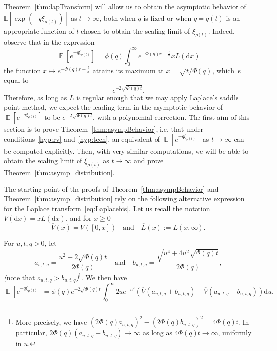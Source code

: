 \documentclass[AHL,Unicode,longabstracts,published]{cedram}
\newcommand{\bbE}{\mathbb{E}}
\DeclareMathOperator{\E}{\mathbb{E}}
\newcommand{\dd}{\mathrm{d}}
\renewcommand{\bar}[1]{\overline{#1}}
\begin{document}
Theorem~\ref{thm:lapTransform} will allow us to obtain the asymptotic behavior of $\bbE[\exp(-q\xi_{\rho(t)})]$ as $t\rightarrow \infty$, both when $q$ is fixed or when $q=q(t)$ is an appropriate function of $t$ chosen to obtain the scaling limit of $\xi_{\rho(t)}$. Indeed, observe that in the expression
\begin{equation}\label{eq:Laplacebis}
\E\left[e^{-q \xi_{\rho(t)}}\right] = \phi(q)\int_0^\infty e^{-\Phi(q)x-\frac{t}{x}} xL(\dd x)
\end{equation}
the function $x \mapsto e^{-\Phi(q)x-\frac{t}{x}}$ attains its maximum at $x=\sqrt{t/\Phi(q)}$, which is equal to
\[
e^{-2 \sqrt{\Phi(q)t}}.
\]
Therefore, as long as $L$ is regular enough that we may apply Laplace's saddle point method, we expect the leading term in the asymptotic behavior of $\E[e^{-q \xi_{\rho(t)}}]$ to be $e^{-2 \sqrt{\Phi(q)t}}$, with a polynomial correction. The first aim of this section is to prove Theorem~\ref{thm:asympBehavior}, i.e. that under conditions~\eqref{hyp:rv} and~\eqref{hyp:tech}, an equivalent of $\E[e^{-q \xi_{\rho(t)}}]$ as $t \to \infty$ can be computed explicitly. Then, with very similar computations, we will be able to obtain the scaling limit of $\xi_{\rho(t)}$ as $t \to \infty$ and prove Theorem~\ref{thm:asymp_distribution}.

The starting point of the proofs of Theorem~\ref{thm:asympBehavior} and Theorem~\ref{thm:asymp_distribution} rely on the following alternative expression for the Laplace transform~\eqref{eq:Laplacebis}. Let us recall the notation $V(\dd x) = x L(\dd x)$, and for $x \geq 0$
\[
\bar{V}(x) = V([0,x]) \quad \text{and} \quad \bar{L}(x) :=L(x,{\infty}).
\]


\begin{lemm}\label{eq:dev}
For $u, t, q >0$, let
\[
a_{u,t,q} = \frac{u^2+2 \sqrt{\Phi(q)t}}{2\Phi(q)} \quad \text{and} \quad b_{u,t,q} = \frac{\sqrt{u^4+4u^2 \sqrt{\Phi(q)t}}}{2\Phi(q)},
\]
\emph{(}note that $a_{u,t,q}>b_{u,t,q}$\emph{)}\footnote{More precisely, we have $(2\Phi(q) a_{u,t,q})^2 - (2 \Phi(q)b_{u,t,q})^2 = 4 \Phi(q) t$. In particular, $2 \Phi(q)(a_{u,t,q} - b_{u,t,q}) \to \infty$ as long as $4 \Phi(q)t \to \infty$, uniformly in $u$.}. We then have
\begin{equation*}
\E\left[e^{-q\xi_{\rho(t)}}\right] = \phi(q) e^{-2 \sqrt{\Phi(q)t}}\int_0^\infty 2u e^{-u^2} \left(\bar V \left(a_{u,t,q}+b_{u,t,q}\right) - \bar V \left(a_{u,t,q}-b_{u,t,q}\right) \right) \dd u.
\end{equation*}
\end{lemm}
\end{document}
